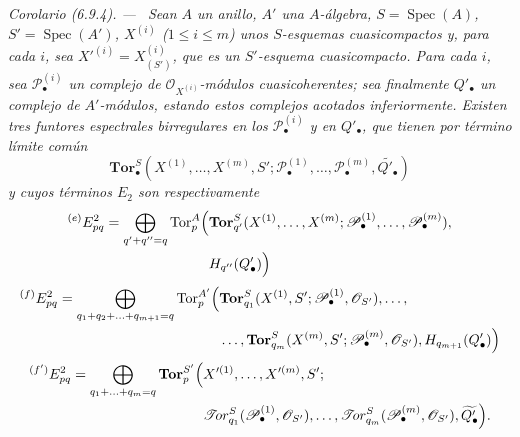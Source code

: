 \documentclass[10pt,oneside]{book}
\newenvironment{corollary}[1][]{\par\medskip\noindent\itshape Corolario (#1). ---\ }{\par}
\begin{document}
\begin{corollary}[6.9.4]
\label{III.6.9.4}
Sean $A$ un anillo, $A'$ una $A$-álgebra,
$S=\operatorname{Spec}(A)$, $S'=\operatorname{Spec}(A')$,
$X^{(i)}$ ($1\leq i\leq m$) unos $S$-esquemas cuasicompactos y, para cada
$i$, sea $X'^{(i)}=X_{(S')}^{(i)}$, que es un $S'$-esquema cuasicompacto.
Para cada $i$, sea $\mathscr P_\bullet^{(i)}$ un complejo de
$\mathscr O_{X^{(i)}}$-módulos cuasicoherentes; sea finalmente
$Q'_\bullet$ un complejo de $A'$-módulos, estando estos complejos acotados
inferiormente. Existen tres funtores espectrales birregulares en los
$\mathscr P_\bullet^{(i)}$ y en $Q'_\bullet$, que tienen por término límite
común
\[
  \mathbf{Tor}_\bullet^S
  (X^{(1)},\ldots,X^{(m)},S';
   \mathscr P_\bullet^{(1)},\ldots,\mathscr P_\bullet^{(m)},
   \widetilde{Q'_\bullet})
\]
y cuyos términos $E_2$ son respectivamente
\[
\begin{split}
  {}^{(e)}E_{pq}^2
  =\bigoplus_{q'+q''=q}
  \operatorname{Tor}_p^A\Bigl(
  &\mathbf{Tor}_{q'}^S
  (X^{(1)},\ldots,X^{(m)};
   \mathscr P_\bullet^{(1)},\ldots,\mathscr P_\bullet^{(m)}),\\
  &H_{q''}(Q'_\bullet)
  \Bigr)
\end{split}
\]
\[
\begin{split}
  {}^{(f)}E_{pq}^2
  =\bigoplus_{q_1+q_2+\ldots+q_{m+1}=q}
  \operatorname{Tor}_p^{A'}\Bigl(
  &\mathbf{Tor}_{q_1}^S
  (X^{(1)},S';\mathscr P_\bullet^{(1)},\mathscr O_{S'}),\ldots,\\
  &\ldots,\mathbf{Tor}_{q_m}^S
  (X^{(m)},S';\mathscr P_\bullet^{(m)},\mathscr O_{S'}),
  H_{q_{m+1}}(Q'_\bullet)
  \Bigr)
\end{split}
\]
\[
\begin{split}
  {}^{(f')}E_{pq}^2
  =\bigoplus_{q_1+\ldots+q_m=q}
  \mathbf{Tor}_p^{S'}\Bigl(
  &X'^{(1)},\ldots,X'^{(m)},S';\\
  &\mathscr{T}\!or_{q_1}^S
  (\mathscr P_\bullet^{(1)},\mathscr O_{S'}),\ldots,
  \mathscr{T}\!or_{q_m}^S
  (\mathscr P_\bullet^{(m)},\mathscr O_{S'}),
  \widetilde{Q'_\bullet}
  \Bigr).
\end{split}
\]
\end{corollary}
\end{document}
